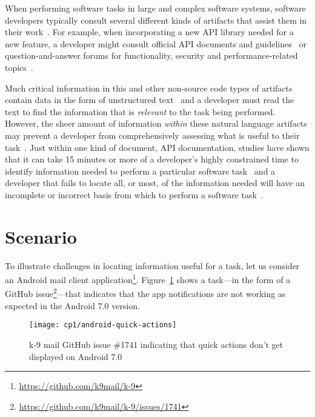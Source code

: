 

When performing software tasks in large and complex software systems, software developers typically consult several different kinds of artifacts that assist them in their work~\cite{Starke2009, Meyer2017}. For example, 
when incorporating a new API library needed for a new feature, a developer might consult official API documents and guidelines~\cite{robillard2011field, umarji2008archetypal} or 
 question-and-answer forums for functionality, security and performance-related topics~\cite{parnin2012, silva2019}.



Much critical information in this and other non-source code types of artifacts 
contain data in the form of unstructured text~\cite{Bavota2016} and 
a developer must read the text to find the information that is \textit{relevant} to the task being performed.
However, the sheer amount of information \textit{within} these natural language artifacts may prevent a developer from comprehensively assessing what is useful to their task~\cite{Murphy2005}. Just within one kind of document, API
documentation, studies have shown that it can take 15 minutes or more
of a developer's highly constrained time to identify 
information needed to perform a particular software task~\cite{endrikat2014, Meyer2017}
and a developer that fails to locate all, or most, of the information needed
 will have an incomplete or incorrect basis from which to perform a software task~\cite{Murphy2005}.



 \section{Scenario}
 \label{cp1:example}
 
 
 
 
 To illustrate challenges in locating information useful for a task, let us consider an  Android mail client application\footnote{\url{https://github.com/k9mail/k-9}}.
 Figure~\ref{fig:android-notifications-task} shows a task---in the form of a GitHub issue\footnote{\url{https://github.com/k9mail/k-9/issues/1741}}---that indicates that the app notifications 
 are not working as expected in the Android 7.0 version. 
 
 \medskip
 \begin{figure}[h!]
     \centering
     \texttt{[image: cp1/android-quick-actions]}
     \caption{k-9 mail GitHub issue \#1741 indicating that quick actions don't get displayed on Android 7.0}
     \label{fig:android-notifications-task}
 \end{figure}
 
